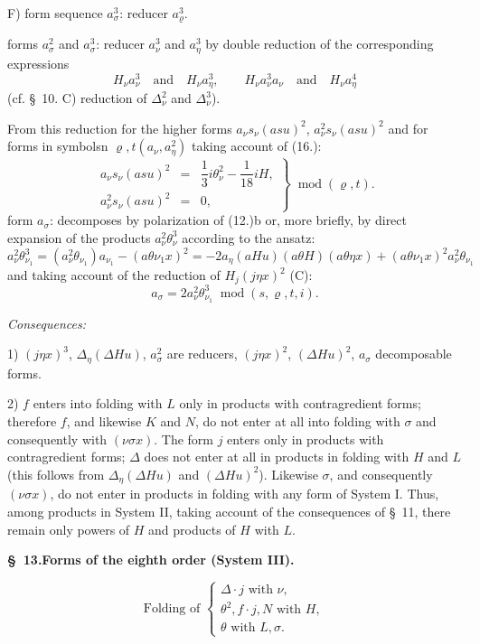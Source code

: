 \documentclass[11pt]{article}
\newcommand{\A}{\Delta}
\newcommand{\R}{\varrho}
\newcommand{\modu}[1]{\;\operatorname{mod} #1}
\providecommand{\modu}[1]{\;\operatorname{mod} #1}
\begin{document}
\noindent F) form sequence $a_\sigma^3$: reducer $a_\R^3$.

forms $a_\sigma^2$ and $a_\sigma^3$: reducer $a_\nu^3$ and $a_\eta^3$ by double reduction of the corresponding expressions
\[
H_\nu a_\nu^3\quad\text{and}\quad H_\nu a_\eta^3,
\qquad
H_\nu a_\nu^3a_\nu\quad\text{and}\quad H_\nu a_\eta^4
\]
(cf. \S\ 10. C) reduction of $\A_\nu^2$ and $\A_\nu^3$).

From this reduction for the higher forms $a_\nu s_\nu(asu)^2$, $a_\nu^2s_\nu(asu)^2$ and for forms in symbolsn $\R,t(a_\nu,a_\eta^2)$ taking account of (16.):
\[
\tag{19}
\left.\begin{array}{rcl}
a_\nu s_\nu(asu)^2&=&\dfrac13 i\theta_\nu^2-\dfrac1{18}iH,\\[0.5em]
a_\nu^2s_\nu(asu)^2&=&0,
\end{array}\right\}\modu{(\R,t)}.
\]
form $a_\sigma$: decomposes by polarization of (12.)b or, more briefly, by direct expansion of the products $a_\nu^2\theta_\nu^3$ according to the ansatz:
\[
a_\nu^2\theta_{\nu_1}^3=(a_\nu^2\theta_{\nu_1})a_{\nu_1}-(a\theta\nu_1x)^2
=-2a_\eta(aHu)(a\theta H)(a\theta\eta x)+(a\theta\nu_1x)^2a_\nu^2\theta_{\nu_1}
\]
and taking account of the reduction of $H_j(j\eta x)^2$ (C):
\[
\tag{20}a_\sigma=2a_\nu^2\theta_{\nu_1}^3\modu{(s,\R,t,i)}.
\]

\noindent\emph{Consequences:}

1) $(j\eta x)^3$, $\A_\eta(\A Hu)$, $a_\sigma^2$ are reducers, $(j\eta x)^2$, $(\A Hu)^2$, $a_\sigma$ decomposable forms.

2) $f$ enters into folding with $L$ only in products with contragredient forms; therefore $f$, and likewise $K$ and $N$, do not enter at all into folding with $\sigma$ and consequently with $(\nu\sigma x)$. The form $j$ enters only in products with contragredient forms; $\A$ does not enter at all in products in folding with $H$ and $L$ (this follows from $\A_\eta(\A Hu)$ and $(\A Hu)^2$). Likewise $\sigma$, and consequently $(\nu\sigma x)$, do not enter in products in folding with any form of System I. Thus, among products in System II, taking account of the consequences of \S\ 11, there remain only powers of $H$ and products of $H$ with $L$.

\begin{center}
\textbf{\S\ 13.\quad Forms of the eighth order (System III).}
\end{center}
\[
\text{Folding of }\left\{\begin{array}{l}
\A\cdot j\text{ with }\nu,\\
\theta^2,
 f\cdot j,
 N\text{ with }H,\\
\theta\text{ with }L,\sigma.
\end{array}\right.
\]
\end{document}
